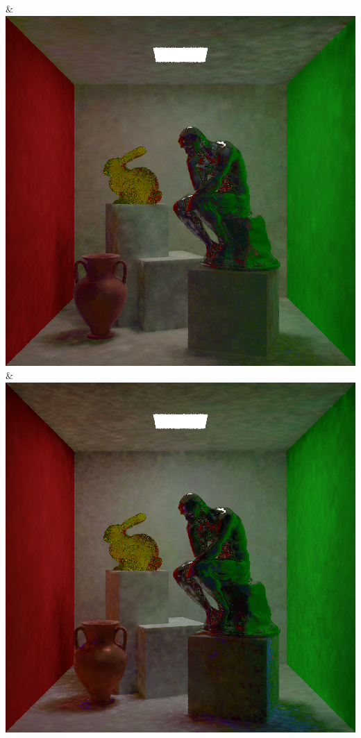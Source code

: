 & \includegraphics[width=\linewidth]{figures/py/tests/batch_size/100+nrc+pt+14_1spp.png}
& \includegraphics[width=\linewidth]{figures/py/tests/batch_size/500+nrc+pt+14_1spp.png}
